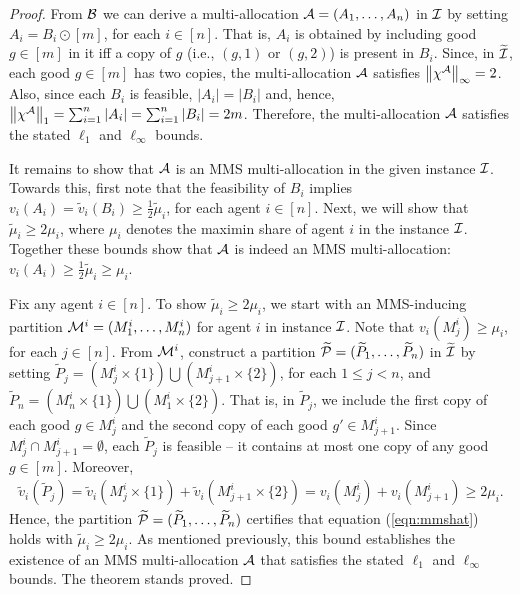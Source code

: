 \begin{proof}
From $\mathcal{B}$ we can derive a multi-allocation $\mathcal{A}=(A_1, \ldots, A_n)$ in $\mathcal{I}$ by setting $A_i = B_i \odot [m]$, for each $i \in [n]$. That is, $A_i$ is obtained by including good $g \in [m]$ in it iff a copy of $g$ (i.e., $(g,1)$ or $(g,2)$) is present in $B_i$. Since, in $\widetilde{\mathcal{I}}$, each good $g \in [m]$ has two copies, the multi-allocation $\mathcal{A}$ satisfies $\left\|\chi^{\mathcal{A}}\right\|_\infty  = 2$. Also, since each $B_i$ is feasible, $|A_i|=|B_i|$ and, hence, $\left\|\chi^{\mathcal{A}}\right\|_1 = \sum_{i=1}^n |A_i| = \sum_{i=1}^n |B_i| = 2m$. Therefore, the multi-allocation $\mathcal{A}$ satisfies the stated $\ell_1$ and $\ell_\infty$ bounds. 

It remains to show that $\mathcal{A}$ is an MMS multi-allocation in the given instance $\mathcal{I}$. Towards this, first note that the feasibility of $B_i$ implies $v_i(A_i) = \widetilde{v}_i(B_i) \geq \frac{1}{2} \widetilde{\mu}_i$, for each agent $i \in [n]$. Next, we will show that $\widetilde{\mu}_i \geq 2 \mu_i$, where $\mu_i$ denotes the maximin share of agent $i$ in the instance $\mathcal{I}$. Together these bounds show that $\mathcal{A}$ is indeed an MMS multi-allocation: $v_i(A_i) \geq \frac{1}{2} \widetilde{\mu}_i \geq \mu_i$. 

Fix any agent $i \in [n]$. To show $\widetilde{\mu}_i \geq 2 \mu_i$, we start with an MMS-inducing partition $\mathcal{M}^i=(M^i_1, \ldots, M^i_n)$ for agent $i$ in instance $\mathcal{I}$. Note that $v_i(M^i_j) \geq \mu_i$, for each $j \in [n]$. From $\mathcal{M}^i$, construct a partition $\widetilde{\mathcal{P}}=(\widetilde{P}_1,\ldots,\widetilde{P}_n)$ in $\widetilde{\mathcal{I}}$ by setting $\widetilde{P}_j = \left( M^i_j \times \{1\} \right) \bigcup \left( M^i_{j+1} \times \{2 \} \right)$, for each $1 \leq j < n$, and  $\widetilde{P}_n =  \left( M^i_n \times \{1\} \right) \bigcup \left( M^i_{1} \times \{2 \} \right)$. That is, in $\widetilde{P}_j$, we include the first copy of each good $g \in M^i_j$ and the second copy of each good $g' \in M^i_{j+1}$. Since $M^i_j \cap M^i_{j+1} = \emptyset$, each $\widetilde{P}_j$ is feasible -- it contains at most one copy of any good $g\in [m]$. Moreover, 
\begin{align*}
    \widetilde{v}_i(\widetilde{P}_j) = \widetilde{v}_i \left(M^i_j \times \{1\}  \right)  +  \widetilde{v}_i \left(M^i_{j+1} \times \{2\}  \right) = v_i(M^i_j) + v_i(M^i_{j+1}) \geq 2 \mu_i.
\end{align*}
Hence, the partition $\widetilde{\mathcal{P}}=(\widetilde{P}_1,\ldots,\widetilde{P}_n)$ certifies that equation (\ref{eqn:mmshat}) holds with $\widetilde{\mu}_i \geq 2 \mu_i$. As mentioned previously, this bound establishes the existence of an MMS multi-allocation $\mathcal{A}$ that satisfies the stated $\ell_1$ and $\ell_\infty$ bounds. The theorem stands proved. 
\end{proof}




